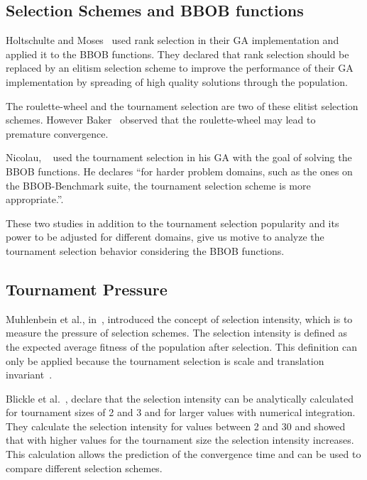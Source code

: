\subsection{Selection Schemes and BBOB functions}



Holtschulte and Moses~\cite{holtschulte2013benchmarking} used rank selection in their GA implementation and applied it to the BBOB functions. They declared that rank selection should be replaced by an elitism selection scheme to improve the performance of their GA implementation by spreading of high quality solutions through the population. 

The roulette-wheel and the tournament selection are two of these elitist selection schemes. However Baker~\cite{baker1987reducing} observed that the roulette-wheel may lead to premature convergence. 

Nicolau, ~\cite{nicolau2009application} used the tournament selection in his GA with the goal of solving the BBOB functions. He declares ``for harder problem domains, such as the ones on the BBOB-Benchmark suite, the tournament selection scheme is more appropriate.''.

These two studies in addition to the tournament selection popularity and its power to be adjusted for different domains, give us motive to analyze the tournament selection behavior considering the BBOB functions.


\subsection{Tournament Pressure}\label{sec:background:tournament_pressure} 
Muhlenbein et al., in~\cite{muhlenbein1993predictive}, introduced the concept of selection intensity, which is to measure the pressure of selection schemes. The selection intensity is defined as the expected average fitness of the population after selection. This definition can only be applied because the tournament selection is scale and translation invariant~\cite{blickle1995mathematical}.

Blickle et al.~\cite{blickle1995mathematical}, declare that the selection intensity can be analytically calculated for tournament sizes of 2 and 3 and for larger values with numerical integration. They calculate the selection intensity for values between 2 and 30 and showed that with higher values for the tournament size the selection intensity increases. This calculation allows the prediction of the convergence time and can be used to compare different selection schemes.

